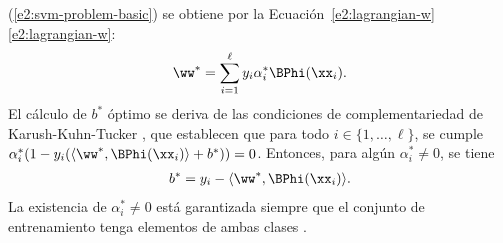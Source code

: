 (\ref{e2:svm-problem-basic}) se obtiene por la
 \iflatexml{}Ecuación~\ref{e2:lagrangian-w}\else\autoref{e2:lagrangian-w}\fi:
%
\begin{align*}\label{e2:w-from-alpha}
  \ww^* = \sum_{i=1}^\ell y_i\alpha^*_i\BPhi(\xx_i).
\end{align*}
%
El cálculo de $b^*$ óptimo se deriva de las condiciones de
complementariedad de Karush-Kuhn-Tucker \cite{kkt,bottou}, que
establecen que para todo $i\in\{1,\ldots,\ell\}$, se cumple
$\alpha^*_i(1-y_i(\langle\ww^*,\BPhi(\xx_i)\rangle+b^*))=0$. Entonces,
para algún $\alpha^*_i\neq0$, se tiene
%
\begin{align}\label{e2:b-from-alpha}
  b^* = y_i - \langle\ww^*,\BPhi(\xx_i)\rangle .
\end{align}
%
La existencia de $\alpha^*_i\neq0$ está garantizada siempre que el
conjunto de entrenamiento tenga elementos de ambas clases
\cite{glasmachers}.
